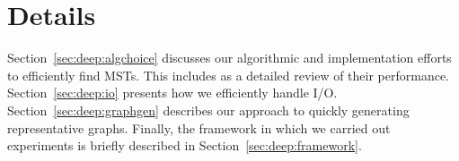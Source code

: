 \section{Details}
\label{sec:deep}
Section~\ref{sec:deep:algchoice} discusses our algorithmic and implementation
efforts to efficiently find MSTs.  This includes as a detailed review of their
performance.  Section~\ref{sec:deep:io} presents how we efficiently handle I/O.
Section~\ref{sec:deep:graphgen} describes our approach to quickly generating
representative graphs.  Finally, the framework in which we carried out
experiments is briefly described in Section~\ref{sec:deep:framework}.




%
